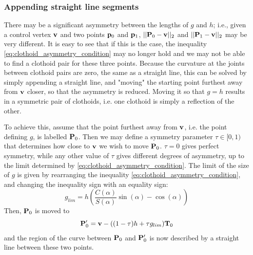 \subsubsection{Appending straight line segments}
There may be a significant asymmetry between the lengths of $g$ and $h$; i.e., given a control vertex $\mathbf{v}$ and two points $\mathbf{p}_0$ and $\mathbf{p}_1$, $||{\mathbf P}_0-\mathbf{v}||_2$ and $||{\mathbf P}_1-\mathbf{v}||_2$ may be very different. It is easy to see that if this is the case, the inequality \ref{eq:clothoid_asymmetry_condition} may no longer hold and we may not be able to find a clothoid pair for these three points. Because the curvature at the joints between clothoid pairs are zero, the same as a straight line, this can be solved by simply appending a straight line, and "moving" the starting point furthest away from ${\mathbf v}$ closer, so that the asymmetry is reduced. Moving it so that $g=h$ results in a symmetric pair of clothoids, i.e. one clothoid is simply a reflection of the other.\cite{clothoid}

To achieve this, assume that the point furthest away from ${\mathbf v}$, i.e. the point defining $g$, is labelled ${\mathbf P}_0$. Then we may define a symmetry parameter $\tau\in [0, 1)$ that determines how close to ${\mathbf v}$ we wish to move ${\mathbf P}_0$. $\tau=0$ gives perfect symmetry, while any other value of $\tau$ gives different degrees of asymmetry, up to the limit determined by \ref{eq:clothoid_asymmetry_condition}. The limit of the size of $g$ is given by rearranging the inequality \ref{eq:clothoid_asymmetry_condition}, and changing the inequality sign with an equality sign:
\begin{equation}
g_{lim} = h\left(\frac{C(\alpha)}{S(\alpha)}\sin(\alpha) - \cos(\alpha)\right)
\end{equation}
Then, ${\mathbf P}_0$ is moved to 
\begin{equation}
{\mathbf P}_0^\prime = {\mathbf v}-((1-\tau)h + \tau g_{lim}){\mathbf T}_0
\end{equation}
and the region of the curve between ${\mathbf P}_0$ and ${\mathbf P}_0^\prime$ is now described by a straight line between these two points. 


